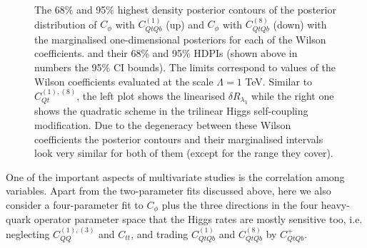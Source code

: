 \begin{figure}[h!]
\begin{center}
	\end{center}
	\caption{The 68\% and 95\% highest density posterior contours of the posterior distribution of $C_\phi$ with $C_{QtQb}^{(1)}$ (up) and $C_\phi$ with $C_{QtQb}^{(8)}$ (down) with the marginalised one-dimensional posteriors for each of the Wilson coefficients. and their 68\% and 95\% HDPIs (shown above in numbers the 95\% CI bounds). 
		The limits correspond to values of the Wilson coefficients evaluated at the scale $\Lambda=1$ TeV. 
		Similar to $C_{Qt}^{(1),(8)}$, the left plot shows the linearised  $\delta R_{\lambda_3}$ while the right one shows the quadratic scheme in the trilinear Higgs self-coupling modification. Due to the degeneracy between these Wilson coefficients the posterior contours and their marginalised intervals look very similar for both of them (except for the range they cover).  \label{2param-cqtqb} }
\end{figure}
One of the important aspects of multivariate studies is the correlation among variables. Apart from the two-parameter fits discussed above, here we also consider a four-parameter fit to $C_\phi$ plus the three directions in the four heavy-quark operator parameter space that the Higgs rates are
mostly sensitive too, i.e. neglecting $C_{QQ}^{(1),(3) }$ and $C_{tt}$, and trading $C_{QtQb}^{(1)}$ and $C_{QtQb}^{(8)}$ by $C_{QtQb}^{+}$.
